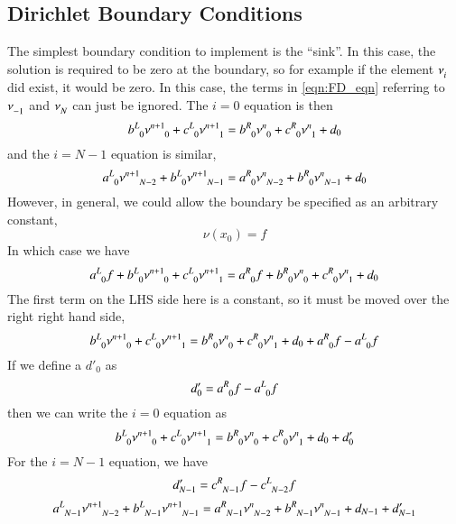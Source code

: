 \documentclass[letterpaper,12pt]{article}
\newcommand \bcf{f}
\begin{document}
\subsection{Dirichlet Boundary Conditions}
The simplest boundary condition to implement is the ``sink''. In this case, the
solution is required to be zero at the boundary, so for example if the element
$\nu\indices{_i}$ did exist, it would be zero. In this case, the terms in
\ref{eqn:FD_eqn} referring to $\nu\indices{_{-1}}$ and  $\nu\indices{_{N}}$ can
just be ignored. The $i=0$ equation is then
\begin{equation}
  \label{eqn:FD_sink_eqn}
  b\indices{^L_0} \nu\indices{^{n+1}_{0}}
+ c\indices{^L_0} \nu\indices{^{n+1}_{1}}
=
  b\indices{^R_0} \nu\indices{^{n  }_{0}}
+ c\indices{^R_0} \nu\indices{^{n  }_{1}}
+ d_0
\end{equation}
and the $i = N-1$ equation is similar,
\begin{equation}
  \label{eqn:FD_sink_eqn_2}
  a\indices{^L_0} \nu\indices{^{n+1}_{N-2}}
+ b\indices{^L_0} \nu\indices{^{n+1}_{N-1}}
=
  a\indices{^R_0} \nu\indices{^{n  }_{N-2}}
+ b\indices{^R_0} \nu\indices{^{n  }_{N-1}}
+ d_0
\end{equation}
However, in general, we could allow the boundary be specified as an arbitrary constant,
\begin{equation}
  \label{eq:sink_bc}
  \nu\left(x_0\right) = \bcf
\end{equation}
In which case we have
\begin{equation}
  a\indices{^L_0} \bcf
+ b\indices{^L_0} \nu\indices{^{n+1}_{0}}
+ c\indices{^L_0} \nu\indices{^{n+1}_{1}}
=
  a\indices{^R_0} \bcf
+ b\indices{^R_0} \nu\indices{^{n  }_{0}}
+ c\indices{^R_0} \nu\indices{^{n  }_{1}}
+ d_0
\end{equation}
The first term on the LHS side here is a constant, so it must be moved over the right right hand side,
\begin{equation}
  b\indices{^L_0} \nu\indices{^{n+1}_{0}}
+ c\indices{^L_0} \nu\indices{^{n+1}_{1}}
=
  b\indices{^R_0} \nu\indices{^{n  }_{0}}
+ c\indices{^R_0} \nu\indices{^{n  }_{1}}
+ d_0
+ a\indices{^R_0} \bcf
- a\indices{^L_0} \bcf
\end{equation}
If we define a $d'_0$ as
\begin{equation}
d'_0 = a\indices{^R_0} \bcf - a\indices{^L_0} \bcf
\end{equation}
then we can write the $i=0$ equation as
\begin{equation}
  b\indices{^L_0} \nu\indices{^{n+1}_{0}}
+ c\indices{^L_0} \nu\indices{^{n+1}_{1}}
=
  b\indices{^R_0} \nu\indices{^{n  }_{0}}
+ c\indices{^R_0} \nu\indices{^{n  }_{1}}
+ d_0
+ d'_0
\end{equation}
For the $i=N-1$ equation, we have
\begin{equation}
  d'_{N-1} = c\indices{^R_{N-1}} \bcf - c\indices{^L_{N-2}} \bcf
\end{equation}
\begin{equation}
  a\indices{^L_{N-1}} \nu\indices{^{n+1}_{N-2}}
+ b\indices{^L_{N-1}} \nu\indices{^{n+1}_{N-1}}
=
  a\indices{^R_{N-1}} \nu\indices{^{n  }_{N-2}}
+ b\indices{^R_{N-1}} \nu\indices{^{n  }_{N-1}}
+ d_{N-1}
+ d'_{N-1}
\end{equation}
\end{document}
